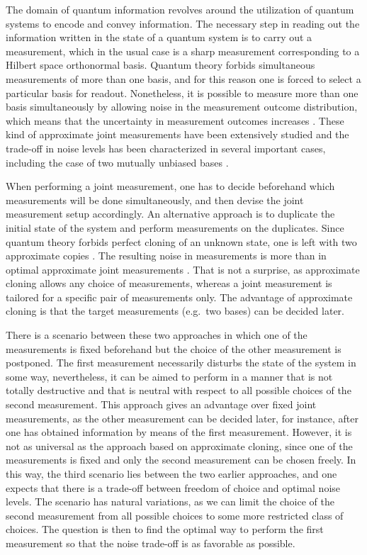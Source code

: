 \documentclass[12pt,reqno]{amsart}
\theoremstyle{definition}
\begin{document}
The domain of quantum information revolves around the utilization of quantum systems to encode and convey information.
The necessary step in reading out the information written in the state of a quantum system is to carry out a measurement, which in the usual case is a sharp measurement corresponding to a Hilbert space orthonormal basis.
Quantum theory forbids simultaneous measurements of more than one basis, and for this reason one is forced to select a particular basis for readout.
Nonetheless, it is possible to measure more than one basis simultaneously by allowing noise in the measurement outcome distribution, which means that the uncertainty in measurement outcomes increases \cite{Busch86}.
These kind of approximate joint measurements have been extensively studied and the trade-off in noise levels has been characterized in several important cases, including the case of two mutually unbiased bases \cite{CaHeTo12,UoLuMoHe16,CaHeTo19,CaCaTo19,DeSkFrBr19}.

When performing a joint measurement, one has to decide beforehand which measurements will be done simultaneously, and then devise the joint measurement setup accordingly.
An alternative approach is to duplicate the initial state of the system and perform measurements on the duplicates.
Since quantum theory forbids perfect cloning of an unknown state, one is left with two approximate copies \cite{ScIbGiAc05}. 
The resulting noise in measurements is more than in optimal approximate joint measurements \cite{DaMaSa01,HeMiZi16}. 
That is not a surprise, as approximate cloning allows any choice of measurements, whereas a joint measurement is tailored for a specific pair of measurements only.
The advantage of approximate cloning is that the target measurements (e.g.~two bases) can be decided later.

There is a scenario between these two approaches in which one of the measurements is fixed beforehand but the choice of the other measurement is postponed. 
The first measurement necessarily disturbs the state of the system in some way, nevertheless, it can be aimed to perform in a manner that is not totally destructive and that is neutral with respect to all possible choices of the second measurement.
This approach gives an advantage over fixed joint measurements, as the other measurement can be decided later, for instance, after one has obtained information by means of the first measurement. 
However, it is not as universal as the approach based on approximate cloning, since one of the measurements is fixed and only the second measurement can be chosen freely.
In this way, the third scenario lies between the two earlier approaches, and one expects that there is a trade-off between freedom of choice and optimal noise levels.
The scenario has natural variations, as we can limit the choice of the second measurement from all possible choices to some more restricted class of choices.
The question is then to find the optimal way to perform the first measurement so that the noise trade-off is as favorable as possible.
\end{document}
